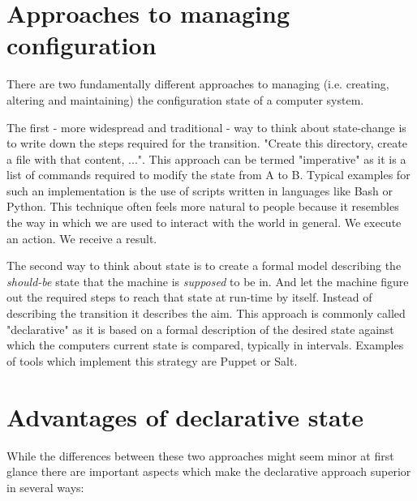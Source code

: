 \documentclass[12pt, a4paper]{article}
\begin{document}
\section{Approaches to managing configuration}
There are two fundamentally different approaches to managing (i.e. creating, altering and maintaining) the configuration state of a computer system.

The first - more widespread and traditional - way to think about state-change is to write down the steps required for the transition. "Create this directory, create a file with that content, ...". This approach can be termed "imperative" as it is a list of commands required to modify the state from A to B. Typical examples for such an implementation is the use of scripts written in languages like Bash or Python. This technique often feels more natural to people because it resembles the way in which we are used to interact with the world in general. We execute an action. We receive a result.

The second way to think about state is to create a formal model describing the \textit{should-be} state that the machine is \textit{supposed} to be in. And let the machine figure out the required steps to reach that state at run-time by itself. Instead of describing the transition it describes the aim. This approach is commonly called "declarative" as it is based on a formal description of the desired state against which the computers current state is compared, typically in intervals. Examples of tools which implement this strategy are Puppet or Salt.

\section{Advantages of declarative state}
While the differences between these two approaches might seem minor at first glance there are important aspects which make the declarative approach superior in several ways:
\end{document}
